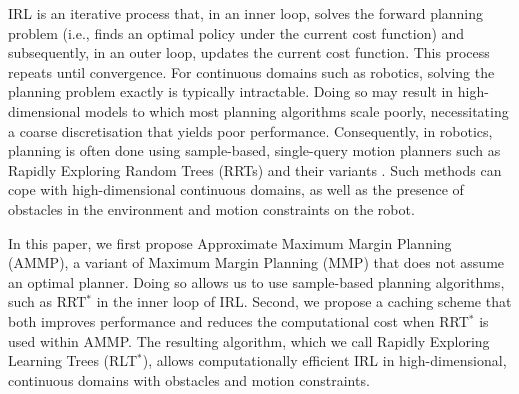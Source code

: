 \documentclass[letterpaper, 10 pt, conference]{ieeeconf}
\begin{document}
IRL is an iterative process that, in an inner loop, solves the forward planning problem (i.e., finds an optimal policy under the current cost function) and subsequently, in an outer loop, updates the current cost function. This process repeats until convergence. For continuous domains such as robotics, solving the planning problem exactly is typically intractable. Doing so may result in high-dimensional models to which most planning algorithms scale poorly, necessitating a coarse discretisation that yields poor performance.  Consequently, in robotics, planning is often done using sample-based, single-query motion planners such as Rapidly Exploring Random Trees (RRTs) \cite{lavalle1998rapidly} and their variants \cite{karaman2011sampling}. Such methods can cope with high-dimensional continuous domains, as well as the presence of obstacles in the environment and motion constraints on the robot.



In this paper, we first propose Approximate Maximum Margin Planning (AMMP), a variant of Maximum Margin Planning (MMP) \cite{ratliff2006maximum} that does not assume an optimal planner. Doing so allows us to use sample-based planning algorithms, such as RRT$^*$ in the inner loop of IRL. Second, we propose a caching scheme that both improves performance and reduces the computational cost when RRT$^*$ is used within AMMP. The resulting algorithm, which we call Rapidly Exploring Learning Trees (RLT$^*$),  allows computationally efficient IRL in high-dimensional, continuous domains with obstacles and motion constraints. 
\end{document}
